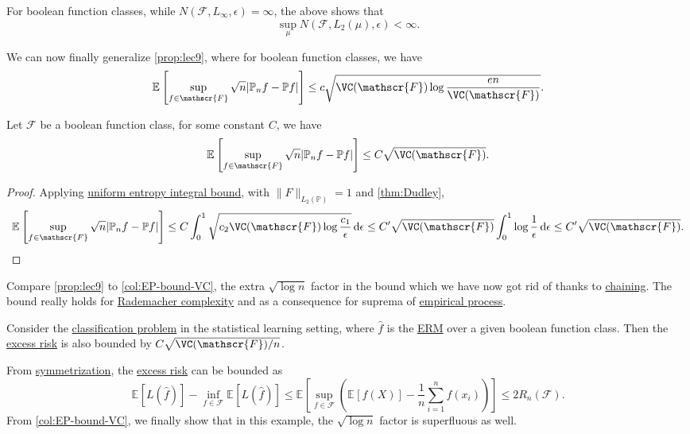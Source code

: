 \begin{remark}
	For boolean function classes, while \(N(\mathscr{F} , L_\infty , \epsilon ) = \infty \), the above shows that
	\[
		\sup _\mu N(\mathscr{F} , L_2(\mu ), \epsilon ) < \infty .
	\]
\end{remark}

We can now finally generalize \autoref{prop:lec9}, where for boolean function classes, we have
\[
	\mathbb{E}_{}\left[\sup _{f\in \mathscr{F} } \sqrt{n} \vert \mathbb{P} _n f - \mathbb{P} f \vert  \right]
	\leq c \sqrt{\VC(\mathscr{F} )\log \frac{en}{\VC(\mathscr{F} )}} .
\]

\begin{corollary}\label{col:EP-bound-VC}
	Let \(\mathscr{F} \) be a boolean function class, for some constant \(C\), we have
	\[
		\mathbb{E}_{}\left[\sup _{f\in \mathscr{F} } \sqrt{n} \vert \mathbb{P} _n f - \mathbb{P} f \vert \right]
		\leq C \sqrt{\VC(\mathscr{F} )} .
	\]
\end{corollary}
\begin{proof}
	Applying \hyperref[thm:uniform-entropy-integral-bound]{uniform entropy integral bound}, with \(\lVert F \rVert _{L_2(\mathbb{P} )} = 1\) and \autoref{thm:Dudley},
	\[
		\mathbb{E}_{}\left[\sup _{f\in \mathscr{F} } \sqrt{n} \vert \mathbb{P} _n f - \mathbb{P} f \vert \right]
		\leq C \int_{0}^{1} \sqrt{c_2 \VC(\mathscr{F} ) \log \frac{c_1}{\epsilon }}  \,\mathrm{d}\epsilon
		\leq C^{\prime} \sqrt{\VC(\mathscr{F} )} \int_{0}^{1} \log \frac{1}{\epsilon } \,\mathrm{d}\epsilon
		\leq C^{\prime} \sqrt{\VC(\mathscr{F} )} .
	\]
\end{proof}

\begin{remark}
	Compare \autoref{prop:lec9} to \autoref{col:EP-bound-VC}, the extra \(\sqrt{\log n}\) factor in the bound which we have now got rid of thanks to \hyperref[note:chaining]{chaining}. The bound really holds for \hyperref[def:Rademacher-complexity]{Rademacher complexity} and as a consequence for suprema of \hyperref[def:EP]{empirical process}.
\end{remark}

\begin{note}
	Consider the \hyperref[eg:1D-classification-thresholds]{classification problem} in the statistical learning setting, where \(\hat{f} \) is the \hyperref[prb:ERM]{ERM} over a given boolean function class. Then the \hyperref[not:excess-risk]{excess risk} is also bounded by \(C \sqrt{\VC(\mathscr{F} ) / n} \).
\end{note}
\begin{explanation}
	From \hyperref[lma:symmetrization]{symmetrization}, the \hyperref[not:excess-risk]{excess risk} can be bounded as
	\[
		\mathbb{E}_{}\left[L(\hat{f} ) \right] - \inf _{f\in \mathscr{F} } \mathbb{E}_{}\left[L(\hat{f} ) \right]
		\leq \mathbb{E}_{}\left[\sup _{f\in \mathscr{F} } \left( \mathbb{E}_{}\left[f(X) \right] - \frac{1}{n}\sum_{i=1}^{n} f(x_i) \right) \right]
		\leq 2R_n(\mathscr{F} ).
	\]
	From \autoref{col:EP-bound-VC}, we finally show that in this example, the \(\sqrt{\log n} \) factor is superfluous as well.
\end{explanation}

